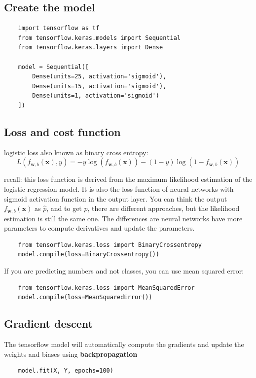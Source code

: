 \subsection*{Create the model}
\begin{verbatim}
    import tensorflow as tf
    from tensorflow.keras.models import Sequential
    from tensorflow.keras.layers import Dense

    model = Sequential([
        Dense(units=25, activation='sigmoid'),
        Dense(units=15, activation='sigmoid'),
        Dense(units=1, activation='sigmoid')
    ])
\end{verbatim}

\subsection*{Loss and cost function}
logistic loss also known as binary cross entropy:
\[ L(f_{\mathbf{w}, b}(\mathbf{x}), y) = -y \log(f_{\mathbf{w}, b}(\mathbf{x})) - (1 - y) \log(1 - f_{\mathbf{w}, b}(\mathbf{x})) \]
\begin{notebox}
    recall: this loss function is derived from the maximum likelihood estimation of the logistic regression model.
    It is also the loss function of neural networks with sigmoid activation function in the output layer.
    You can think the output $f_{\mathbf{w}, b}(\mathbf{x})$ as $\hat{p}$, and to get $\hat{p}$, there are 
    different approaches, but the likelihood estimation is still the same one.
    The differences are neural networks have more parameters to compute derivatives and update the parameters.
\end{notebox}
\begin{verbatim}
    from tensorflow.keras.loss import BinaryCrossentropy
    model.compile(loss=BinaryCrossentropy())
\end{verbatim}
If you are predicting numbers and not classes, you can use mean squared error:
\begin{verbatim}
    from tensorflow.keras.loss import MeanSquaredError
    model.compile(loss=MeanSquaredError())
\end{verbatim}

\subsection*{Gradient descent}
The tensorflow model will automatically compute the
 gradients and update the weights and biases using \textbf{backpropagation}\par
\begin{verbatim}
    model.fit(X, Y, epochs=100)
\end{verbatim}

